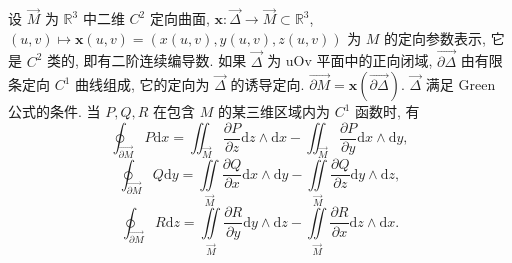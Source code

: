 \begin{lemma}\label{lem:11.4.3}
设 $\overrightarrow{M}$ 为 $\mathbb{R}^{3}$ 中二维 $C^{2}$ 定向曲面, $\boldsymbol{x}:\overrightarrow{\Delta}\to\overrightarrow{M}\subset\mathbb{R}^{3}$, $(u,v)\mapsto\boldsymbol{x}(u,v)=(x(u,v),y(u,v),z(u,v))$ 为 $M$ 的定向参数表示, 它是 $C^{2}$ 类的, 即有二阶连续编导数. 如果 $\overrightarrow{\Delta}$ 为 uOv 平面中的正向闭域, $\overrightarrow{\partial\Delta}$ 由有限条定向 $C^{1}$ 曲线组成, 它的定向为 $\overrightarrow{\Delta}$ 的诱导定向. $\overrightarrow{\partial M}=\boldsymbol{x}(\overrightarrow{\partial\Delta})$. $\overrightarrow{\Delta}$ 满足 Green 公式的条件. 当 $P,Q,R$ 在包含 $M$ 的某三维区域内为 $C^{1}$ 函数时, 有
\[
\oint_{\overrightarrow{\partial M}}P\mathrm{d}x=\iint_{\overrightarrow{M}}\frac{\partial P}{\partial z}\mathrm{d}z\wedge\mathrm{d}x-\iint_{\overrightarrow{M}}\frac{\partial P}{\partial y}\mathrm{d}x\wedge\mathrm{d}y,
\]
\[
\oint_{\overrightarrow{\partial M}}Q\mathrm{d}y=\iint\limits_{\overrightarrow{M}}\frac{\partial Q}{\partial x}\mathrm{d}x\wedge\mathrm{d}y-\iint\limits_{\overrightarrow{M}}\frac{\partial Q}{\partial z}\mathrm{d}y\wedge\mathrm{d}z,
\]
\[
\oint_{\overrightarrow{\partial M}}R\mathrm{d}z=\iint\limits_{\overrightarrow{M}}\frac{\partial R}{\partial y}\mathrm{d}y\wedge\mathrm{d}z-\iint\limits_{\overrightarrow{M}}\frac{\partial R}{\partial x}\mathrm{d}z\wedge\mathrm{d}x.
\]
\end{lemma}
